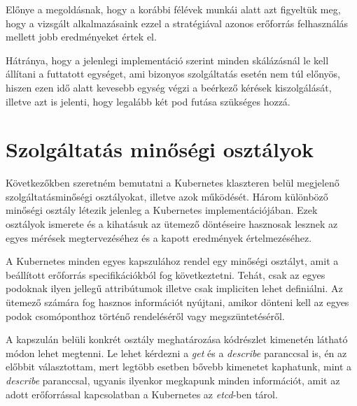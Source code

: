 Előnye a megoldásnak, hogy a korábbi félévek munkái alatt azt figyeltük meg, hogy a vizsgált alkalmazásaink ezzel a stratégiával azonos erőforrás felhasználás mellett jobb eredményeket értek el.\citep{bscThesis} 

Hátránya, hogy a jelenlegi implementáció szerint minden skálázásnál le kell állítani a futtatott egységet, ami bizonyos szolgáltatás esetén nem túl előnyös, hiszen ezen idő alatt kevesebb egység végzi a beérkező kérések kiszolgálását, illetve azt is jelenti, hogy legalább két pod futása szükséges hozzá.




\section{Szolgáltatás minőségi osztályok}

Következőkben szeretném bemutatni a Kubernetes klaszteren belül megjelenő szolgáltatásminőségi osztályokat, illetve azok működését.
Három különböző minőségi osztály létezik jelenleg a Kubernetes implementációjában\citep{KubernetesQoSClasses}. 
Ezek osztályok ismerete és a kihatásuk az ütemező döntéseire hasznosak lesznek az egyes mérések megtervezéséhez és a kapott eredmények értelmezéséhez.

A Kubernetes minden egyes kapszulához rendel egy minőségi osztályt, amit a beállított erőforrás specifikációkból fog következtetni.
Tehát, csak az egyes podoknak ilyen jellegű attribútumok illetve csak impliciten lehet definiálni.
Az ütemező számára fog hasznos információt nyújtani, amikor dönteni kell az egyes podok csomóponthoz történő rendeléséről vagy megszüntetéséről.

A kapszulán belüli konkrét osztály meghatározása  kódrészlet kimenetén látható módon lehet megtenni.
Le lehet kérdezni a \textit{get} és a \textit{describe} paranccsal is, én az előbbit választottam, mert legtöbb esetben bővebb kimenetet kaphatunk, mint a \textit{describe} paranccsal, ugyanis ilyenkor megkapunk minden információt, amit az adott erőforrással kapcsolatban a Kubernetes az \textit{etcd}-ben tárol.

